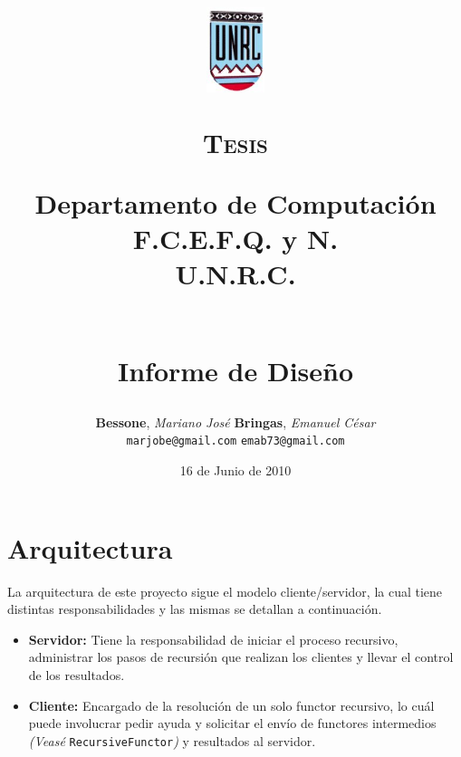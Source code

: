 \documentclass[a4paper,12pt,twoside]{article}
\title{
    \includegraphics[width=50pt,height=70pt]{unrc.jpg}\\
    \begin{large}\textsc{Tesis}\\ \end{large}
    \small
        \textbf{Departamento de Computación} \\
        \textbf{F.C.E.F.Q. y N.} \\
        \textbf{U.N.R.C.}
     \\ [4cm]
    \begin{Huge}\ra        \end{Huge} \\
    \small Informe de Diseño\\[3cm]
}
\author{\textbf{Bessone}, \textit{Mariano José} \hspace{4cm} \textbf{Bringas}, \textit{Emanuel César}\\
        \small{\texttt{marjobe@gmail.com}}  \hspace{6cm}  \small{\texttt{emab73@gmail.com}} \\[3cm]
}
\date{16 de Junio de 2010}
\begin{document}
    \pagestyle{myheadings}
    
    \maketitle
    \newpage
    \tableofcontents
    \newpage

    \section{Arquitectura}
        La arquitectura de este proyecto sigue el modelo cliente/servidor, la cual tiene distintas responsabilidades y las mismas
        se detallan a continuación.

        \begin{itemize}
         \item \textbf{Servidor:} Tiene la responsabilidad de iniciar el proceso recursivo, administrar los pasos de recursión que 
            realizan los clientes y llevar el control de los resultados.
         \item \textbf{Cliente:} Encargado de la resolución de un solo functor recursivo, lo cuál puede involucrar pedir ayuda y 
            solicitar el envío de functores intermedios \textit{(Veasé} \texttt{RecursiveFunctor}\textit{)} y resultados al servidor.
        \end{itemize}
\end{document}
